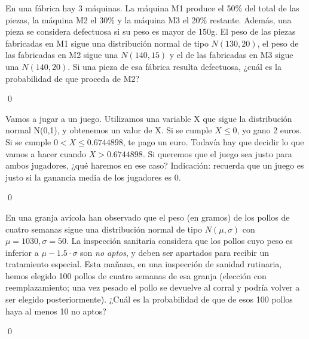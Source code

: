 \documentclass[10pt,a4paper]{article}\usepackage[]{graphicx}\usepackage[]{color}
\begin{document}
\begin{ejercicio}
\label{tut05:ejercicio52}
En una fábrica hay 3 máquinas. La máquina M1 produce el 50\% del total de las piezas, la 		
	máquina M2 el 30\% y la máquina M3 el 20\% restante. Además, una pieza se considera defectuosa si su
	peso es mayor de 150g. El peso de las piezas fabricadas en M1 sigue una distribución normal de tipo
	$N(130,20)$, el peso de las fabricadas en M2 sigue una $N(140,15)$ y el de las fabricadas en M3
	sigue una $N(140,20)$. Si una pieza de esa fábrica resulta defectuosa, ¿cuál es la probabilidad de
	que proceda de M2?
	
\qed\end{ejercicio}
\begin{ejercicio}
\label{tut05:ejercicio53}
Vamos a jugar a un juego. Utilizamos una variable X que sigue la distribución normal N(0,1), y
	obtenemos un valor de X. Si se cumple $X\leq 0$, yo gano 2 euros. Si se cumple $0<X\leq  0.6744898$,
	te pago un euro. Todavía hay que decidir lo que vamos a hacer cuando $X>0.6744898$. Si queremos que
	el juego sea justo para ambos jugadores, ¿qué haremos en ese caso? Indicación: recuerda que un juego
	es justo si la ganancia media de los jugadores es 0.
	
\qed\end{ejercicio}
\begin{ejercicio}
\label{tut05:ejercicio54}
En una granja avícola han observado que el peso (en gramos) de los pollos de cuatro semanas
	sigue una distribución normal de tipo $N(\mu,\sigma)$ con $\mu=1030, \sigma=50$. La inspección
	sanitaria considera que los pollos cuyo peso es inferior a $\mu-1.5\cdot\sigma$  son {\em no aptos},
	y deben ser apartados para recibir un tratamiento especial. Esta mañana, en una inspección de
	sanidad rutinaria, hemos elegido 100 pollos de cuatro semanas de esa granja (elección con
	reemplazamiento; una vez pesado el pollo se devuelve al corral y podría volver a ser elegido
	posteriormente). ¿Cuál es la probabilidad de que de esos 100 pollos haya al menos 10 no aptos?

\qed\end{ejercicio}

\end{document}
